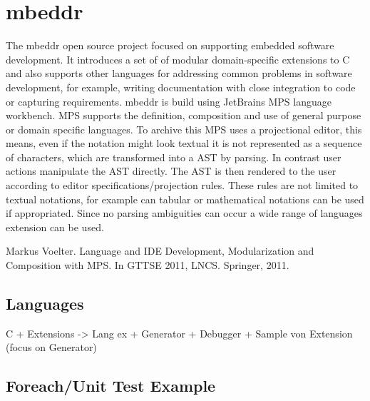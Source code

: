 \section{mbeddr}


The mbeddr open source project focused on supporting embedded software development. It introduces a set of of modular domain-specific extensions to C and also supports other languages for addressing common problems in software development, for example, writing documentation with close integration to code or capturing requirements. mbeddr is build using JetBrains MPS language workbench. MPS supports the definition, composition and use of general purpose or domain specific languages. To archive this MPS uses a projectional editor, this means, even if the notation might look textual it is not represented as a sequence of characters, which are transformed into a AST by parsing. In contrast user actions manipulate the AST directly. The AST is then rendered to the user according to editor specifications/projection rules. These rules are not limited to textual notations, for example can tabular or mathematical notations can be used if appropriated. Since no parsing ambiguities can occur a wide range of languages extension can be used.



 Markus Voelter. Language and IDE Development, Modularization and Composition with MPS. In GTTSE 2011, LNCS. Springer, 2011.

\subsection{Languages}


C + Extensions 
	    -> Lang ex +  Generator + Debugger
		+ Sample von Extension (focus on Generator)
		
\subsection{Foreach/Unit Test Example}
